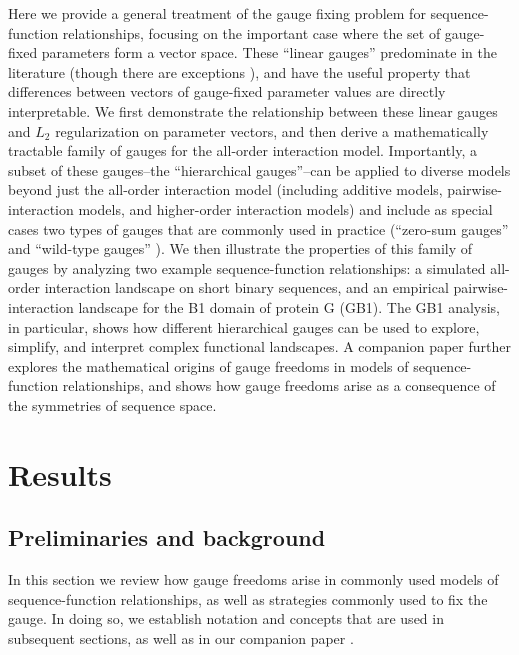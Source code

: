 \documentclass[10pt,letterpaper]{article}
\begin{document}
Here we provide a general treatment of the gauge fixing problem for sequence-function relationships, focusing on the important case where the set of gauge-fixed parameters form a vector space. These ``linear gauges'' predominate in the literature (though there are exceptions \cite{Berg:1987wu, Kinney:2010tn}), and have the useful property that differences between vectors of gauge-fixed parameter values are directly interpretable. We first demonstrate the relationship between these linear gauges and $L_2$ regularization on parameter vectors, and then derive a mathematically tractable family of gauges for the all-order interaction model. Importantly, a subset of these gauges--the ``hierarchical gauges''--can be applied to diverse models beyond just the all-order interaction model (including additive models, pairwise-interaction models, and higher-order interaction models) and include as special cases two types of gauges that are commonly used in practice (``zero-sum gauges'' \cite{Ekeberg:2013bb, Cocco:2018aa} and ``wild-type gauges'' \cite{Ekeberg:2013bb, Hsu:2022ek, Tareen:2022dh}). We then illustrate the properties of this family of gauges by analyzing two example sequence-function relationships: a simulated all-order interaction landscape on short binary sequences, and an empirical pairwise-interaction landscape for the B1 domain of protein G (GB1). The GB1 analysis, in particular, shows how different hierarchical gauges can be used to explore, simplify, and interpret complex functional landscapes. A companion paper \cite{Posfai:2024bb} further explores the mathematical origins of gauge freedoms in models of sequence-function relationships, and shows how gauge freedoms arise as a consequence of the symmetries of sequence space.

\section*{Results}

\subsection*{Preliminaries and background}

In this section we review how gauge freedoms arise in commonly used models of sequence-function relationships, as well as strategies commonly used to fix the gauge. In doing so, we establish notation and concepts that are used in subsequent sections, as well as in our companion paper \cite{Posfai:2024bb}.
\end{document}
